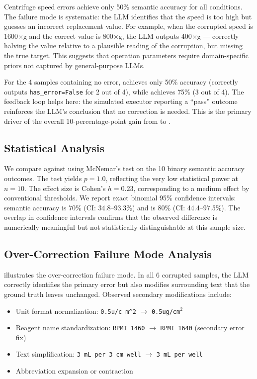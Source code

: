 Centrifuge speed errors achieve only 50\% semantic accuracy for all conditions.
The failure mode is systematic: the LLM identifies that the speed is too high but guesses an incorrect replacement value.
For example, when the corrupted speed is 1600$\times$g and the correct value is 800$\times$g, the LLM outputs 400$\times$g --- correctly halving the value relative to a plausible reading of the corruption, but missing the true target.
This suggests that operation parameters require domain-specific priors not captured by general-purpose LLMs.

For the 4 samples containing no error, \vanilla achieves only 50\% accuracy (correctly outputs \texttt{has\_error=False} for 2 out of 4), while \feedbackthree achieves 75\% (3 out of 4).
The feedback loop helps here: the simulated executor reporting a ``pass'' outcome reinforces the LLM's conclusion that no correction is needed.
This is the primary driver of the overall 10-percentage-point gain from \vanilla to \feedbackthree.

\subsection{Statistical Analysis}
\label{sec:results:stats}

We compare \feedbackthree against \vanilla using McNemar's test on the 10 binary semantic accuracy outcomes.
The test yields $p = 1.0$, reflecting the very low statistical power at $n=10$.
The effect size is Cohen's $h = 0.23$, corresponding to a medium effect by conventional thresholds.
We report exact binomial 95\% confidence intervals: \vanilla semantic accuracy is 70\% (CI: 34.8--93.3\%) and \feedbackthree is 80\% (CI: 44.4--97.5\%).
The overlap in confidence intervals confirms that the observed difference is numerically meaningful but not statistically distinguishable at this sample size.

\subsection{Over-Correction Failure Mode Analysis}
\label{sec:results:overcorrection}

 illustrates the over-correction failure mode.
In all 6 corrupted samples, the LLM correctly identifies the primary error but also modifies surrounding text that the ground truth leaves unchanged.
Observed secondary modifications include:
\begin{itemize}[leftmargin=*,itemsep=0pt,topsep=0pt]
    \item Unit format normalization: \texttt{0.5u/c m\^{}2} $\to$ \texttt{0.5ug/cm$^2$}
    \item Reagent name standardization: \texttt{RPMI 1460} $\to$ \texttt{RPMI 1640} (secondary error fix)
    \item Text simplification: \texttt{3 mL per 3 cm well} $\to$ \texttt{3 mL per well}
    \item Abbreviation expansion or contraction
\end{itemize}

